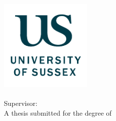 \thispagestyle{empty}
\begin{center}
  \includegraphics[width=4.5cm]{figures/UoS_logo.pdf}
  \vfill
  \huge\textbf{\ttitle}\\
  \Large\textbf{\ssubtitle}
  \vskip 1cm
  \Large\textbf{\aauthor\\}
  \vskip 3cm
  Supervisor: \ssupervisor\\
  \vfill
  A thesis submitted for the degree of\\
  \textit{\ddegree}
  \vfill
  \sschool\\
  \uuniversity\\
  \pplace\\
  \ddate%
\end{center}

